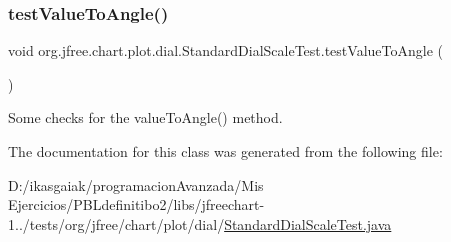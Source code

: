 \subsubsection{\texorpdfstring{test\+Value\+To\+Angle()}{testValueToAngle()}}
{\footnotesize\ttfamily void org.\+jfree.\+chart.\+plot.\+dial.\+Standard\+Dial\+Scale\+Test.\+test\+Value\+To\+Angle (\begin{DoxyParamCaption}{ }\end{DoxyParamCaption})}

Some checks for the value\+To\+Angle() method. 

The documentation for this class was generated from the following file\+:\begin{DoxyCompactItemize}
\item 
D\+:/ikasgaiak/programacion\+Avanzada/\+Mis Ejercicios/\+P\+B\+Ldefinitibo2/libs/jfreechart-\/1../tests/org/jfree/chart/plot/dial/\mbox{\hyperlink{_standard_dial_scale_test_8java}{Standard\+Dial\+Scale\+Test.\+java}}\end{DoxyCompactItemize}
